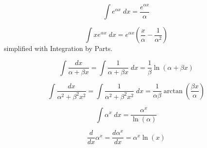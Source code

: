 \begin{equation}\label{eq:Exponential_Indefinite_Integral}
  \int e^{\alpha x} \; dx = \frac{e^{\alpha x}}{\alpha}
\end{equation}

\begin{equation}\label{eq:x_Exponential_Indefinite_Integral}
  \int x e^{\alpha x} \; dx = e^{\alpha x} \left( \frac{x}{\alpha} - \frac{1}{\alpha^{2}} \right)
\end{equation}
 simplified with Integration by Parts.

\begin{equation}\label{eq:Inverse_x_Indefinite_Integral}
  \int \frac{dx}{\alpha + \beta x} = \int \frac{1}{\alpha + \beta x} \; dx = \frac{1}{\beta} \ln (\alpha + \beta x)
\end{equation}

\begin{equation}\label{eq:Inverse_x_Squared_Indefinite_Integral}
  \int \frac{dx}{\alpha^{2} + \beta^{2} x^{2}} = \int \frac{1}{\alpha^{2} + \beta^{2} x^{2}} \; dx = \frac{1}{\alpha \beta} \arctan \left( \frac{\beta x}{\alpha} \right)
\end{equation}

\begin{equation}\label{eq:a_Exponential_Indefinite_Integral}
  \int \alpha^{x} \; dx = \frac{\alpha^{x}}{\ln(\alpha)}
\end{equation}

\begin{equation}\label{eq:a_Exponential_Derivative}
  \frac{d}{dx} \alpha^{x} = \frac{d\alpha^{x}}{dx} = \alpha^{x} \ln(x)
\end{equation}

